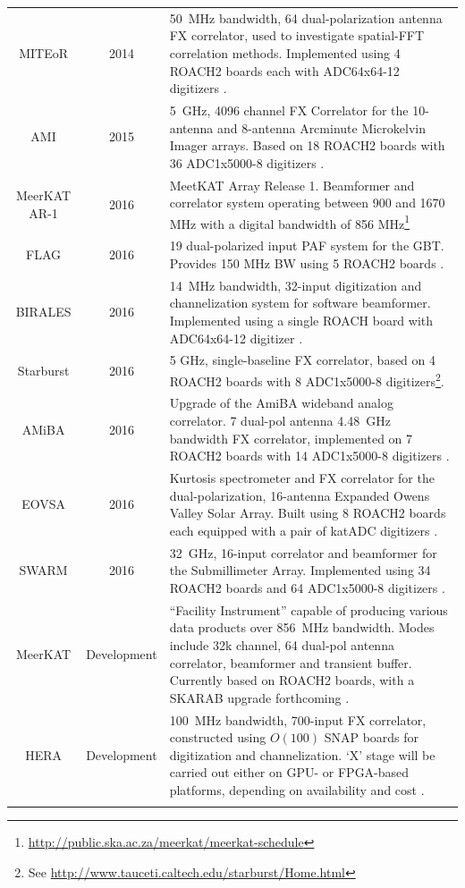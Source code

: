\documentclass{ws-jai}
\begin{document}
\begin{longtable}{ccp{10cm}}
  MITEoR           & 2014 & 50~MHz bandwidth, 64 dual-polarization antenna FX correlator, used to investigate spatial-FFT correlation methods. Implemented using 4 ROACH2 boards each with ADC64x64-12 digitizers \citep{2014MNRAS.445.1084Z}. \\
  AMI              & 2015 & 5~GHz, 4096 channel FX Correlator for the 10-antenna and 8-antenna Arcminute Microkelvin Imager arrays. Based on 18 ROACH2 boards with 36 ADC1x5000-8 digitizers \citep{Zwart21122008, ami-digital}. \\
  MeerKAT AR-1     & 2016 & MeetKAT Array Release 1. Beamformer and correlator system operating between 900 and 1670 MHz with a digital bandwidth of 856 MHz\footnote{\url{http://public.ska.ac.za/meerkat/meerkat-schedule}} \\
  FLAG             & 2016 & 19 dual-polarized input PAF system for the GBT. Provides 150 MHz BW using 5 ROACH2 boards \citep{gb_flag, gb_beamformer}. \\
  BIRALES          & 2016 & 14~MHz bandwidth, 32-input digitization and channelization system for software beamformer. Implemented using a single ROACH board with ADC64x64-12 digitizer \citep{7180719}. \\
  Starburst        & 2016 & 5 GHz, single-baseline FX correlator, based on 4 ROACH2 boards with 8 ADC1x5000-8 digitizers\footnote{See \url{http://www.tauceti.caltech.edu/starburst/Home.html}}. \\
  AMiBA            & 2016 & Upgrade of the AmiBA wideband analog correlator. 7 dual-pol antenna 4.48~GHz bandwidth FX correlator, implemented on 7 ROACH2 boards with 14 ADC1x5000-8 digitizers \citep{amiba-adc, amiba-interim}. \\
  EOVSA            & 2016 & Kurtosis spectrometer and FX correlator for the dual-polarization, 16-antenna Expanded Owens Valley Solar Array. Built using 8 ROACH2 boards each equipped with a pair of katADC digitizers \citep{eovsa}.\\
  SWARM            & 2016 & 32~GHz, 16-input correlator and beamformer for the Submillimeter Array. Implemented using 34 ROACH2 boards and 64 ADC1x5000-8 digitizers \citep{swarm}. \\
  MeerKAT          & Development & ``Facility Instrument'' capable of producing various data products over 856~MHz bandwidth. Modes include 32k channel, 64 dual-pol antenna correlator, beamformer and transient buffer. Currently based on ROACH2 boards, with a SKARAB upgrade forthcoming \citep{meerkat-req}. \\
  HERA             & Development & 100~MHz bandwidth, 700-input FX correlator, constructed using $O(100)$ SNAP boards for digitization and channelization. `X' stage will be carried out either on GPU- or FPGA-based platforms, depending on availability and cost \citep{2016arXiv160607473D}. \\
  \label{table:casper-instruments-correlators}

\end{longtable}
\end{document}
